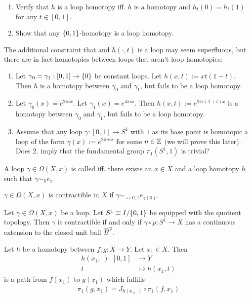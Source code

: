 \begin{exercise}
	\begin{enumerate}
		\item Verify that $h$ is a loop homotopy iff. $h$ is a homotopy and $h_t(0) = h_t(1)$ for any $t \in [0,1]$.
		\item Show that any $\qty{0,1}$-homotopy is a loop homotopy.
	\end{enumerate}	
\end{exercise}
The additional constraint that and $h(\cdot, t)$ is a loop may seem superfluous, but there are in fact homotopies between loops that aren't loop homotopies:
\begin{exercise}
	\begin{enumerate}
		\item Let $\gamma_0 = \gamma_1 : [0,1] \to \qty{0}$ be constant loops. Let $h(x,t) := xt(1-t)$. Then $h$ is a homotopy between $\gamma_0$ and $\gamma_1$, but fails to be a loop homotopy.
		\item Let $\gamma_0(x) = e^{2\pi i x}$. Let $\gamma_1(x) = e^{4 \pi i x}$. Then $h(x,t) := e^{2 \pi i (1+t)x}$ is a homotopy between $\gamma_0$ and $\gamma_1$, but fails to be a loop homotopy.
		\item Assume that any loop $\gamma : [0,1] \to S^1$ with $1$ as its base point is homotopic a loop of the form $\gamma(x) := e^{2\pi n ix}$ for some $n \in \mathbb{Z}$ (we will prove this later). Does 2. imply that the fundamental group $\pi_1(S^1,1)$ is trivial?
	\end{enumerate}
\end{exercise}
\begin{definition}
	A loop $\gamma \in \Omega(X,x)$ is called  iff. there exists an $x \in X$ and a loop homotopy $h$ such that $\gamma \sim_h e_x$.
\end{definition}
\begin{lemma}
	$\gamma \in \Omega(X,x)$ is contractible in $X$ if $\gamma \sim_{\rel {0,1}} e_{\gamma(0)}$.
\end{lemma}
\begin{theorem}
	Let $\gamma \in \Omega(X, x)$ be a loop. Let $S^1 \cong I/\qty{0,1}$ be equipped with the quotient topology. Then $\gamma$ is contractible if and only if $\gamma \circ p : S^1 \to X$ has a continuous extension to the closed unit ball $\overline{{B}}^2$.
\end{theorem}
\begin{theorem}
	Let $h$ be a homotopy between $f,g : X \to Y$. Let $x_1 \in X$. Then
	\begin{align*}
		h(x_1,\cdot) : [0,1] &\to Y\\
		t &\mapsto h(x_1,t)
	\end{align*}
	is a path from $f(x_1)$ to $g(x_1)$
	which fulfills
	\begin{align*}
		\pi_1(g,x_1) = J_{h(x_1, \cdot)} \circ \pi_1(f, x_1)
	\end{align*}
\end{theorem}
